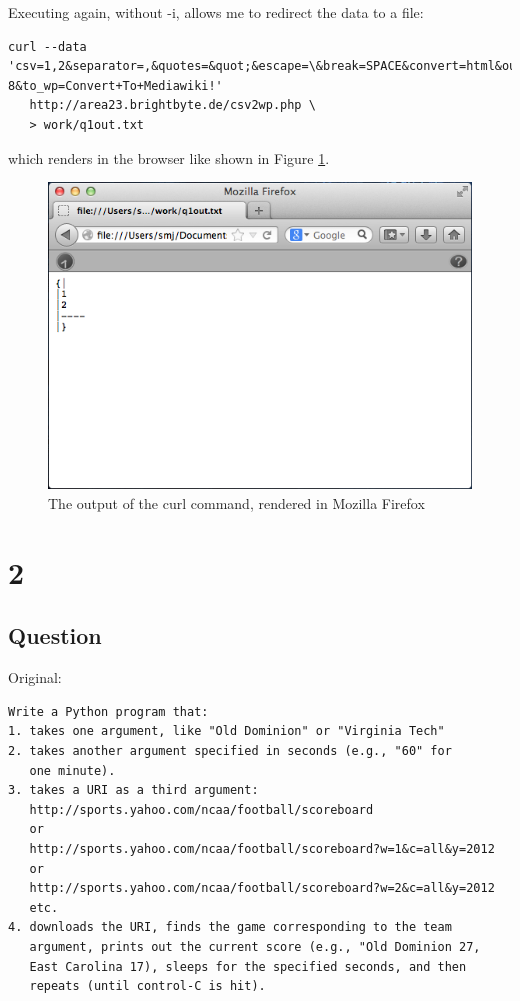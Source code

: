 \documentclass[letterpaper,11pt]{article}
\begin{document}
\newpage
Executing again, without -i, allows me to redirect the data to a file:
\begin{lstlisting}[frame=single]
curl --data 'csv=1,2&separator=,&quotes=&quot;&escape=\&break=SPACE&convert=html&output_encoding=UTF-8&to_wp=Convert+To+Mediawiki!'
   http://area23.brightbyte.de/csv2wp.php \
   > work/q1out.txt
\end{lstlisting}


which renders in the browser like shown in Figure \ref{fig:q1screenie2}.

\begin{figure}
\includegraphics[scale=0.7]{work/q1screenie2.png}
\caption{The output of the curl command, rendered in Mozilla Firefox}
\label{fig:q1screenie2}
\end{figure}




\newpage
\section*{2}

\subsection*{Question}

Original:
\begin{verbatim}
Write a Python program that:
1. takes one argument, like "Old Dominion" or "Virginia Tech"
2. takes another argument specified in seconds (e.g., "60" for 
   one minute).
3. takes a URI as a third argument: 
   http://sports.yahoo.com/ncaa/football/scoreboard
   or
   http://sports.yahoo.com/ncaa/football/scoreboard?w=1&c=all&y=2012
   or
   http://sports.yahoo.com/ncaa/football/scoreboard?w=2&c=all&y=2012
   etc.
4. downloads the URI, finds the game corresponding to the team
   argument, prints out the current score (e.g., "Old Dominion 27, 
   East Carolina 17), sleeps for the specified seconds, and then
   repeats (until control-C is hit).
\end{verbatim}
\end{document}
